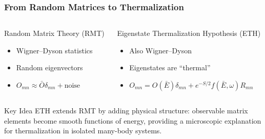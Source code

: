 \begin{frame}
    \frametitle{From Random Matrices to Thermalization}
    
    \begin{columns}[T,onlytextwidth]
        \begin{column}{0.48\textwidth}
            \begin{block}{Random Matrix Theory (RMT)}
                \begin{itemize}
                    \item Wigner–Dyson statistics  
                    \item Random eigenvectors  
                    \item $O_{mn} \approx \bar{O}\delta_{mn} + \text{noise}$
                \end{itemize}
            \end{block}
        \end{column}

        \begin{column}{0.48\textwidth}
            \begin{block}{Eigenstate Thermalization Hypothesis (ETH)}
                \begin{itemize}
                    \item Also Wigner–Dyson  
                    \item Eigenstates are “thermal”  
                    \item $O_{mn} = O(\bar{E})\delta_{mn} + e^{-S/2}f(\bar{E},\omega)R_{mn}$
                \end{itemize}
            \end{block}
        \end{column}
    \end{columns}
    
    \vspace{0.4cm}
    \begin{alertblock}{Key Idea}
    ETH extends RMT by adding physical structure:  
    observable matrix elements become smooth functions of energy,  
    providing a microscopic explanation for thermalization  
    in isolated many-body systems.
    \end{alertblock}
\end{frame}
